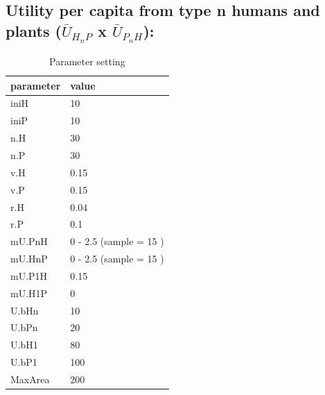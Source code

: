 \documentclass[]{book}
\begin{document}
\hypertarget{utility-per-capita-from-type-n-humans-and-plants-baru_h_np-x-baru_p_nh}{%
\subsection{\texorpdfstring{Utility per capita from type n humans and plants (\(\bar{U}_{H_{n}P}\) x \(\bar{U}_{P_{n}H}\)):}{Utility per capita from type n humans and plants (\textbackslash{}bar\{U\}\_\{H\_\{n\}P\} x \textbackslash{}bar\{U\}\_\{P\_\{n\}H\}):}}\label{utility-per-capita-from-type-n-humans-and-plants-baru_h_np-x-baru_p_nh}}

\begin{table}[!h]

\caption{\label{tab:3mUHnPmUPnHtablepdf}Parameter setting}
\centering
\begin{tabular}{l|l}
\hline
parameter & value\\
\hline
iniH & 10\\
\hline
iniP & 10\\
\hline
n.H & 30\\
\hline
n.P & 30\\
\hline
v.H & 0.15\\
\hline
v.P & 0.15\\
\hline
r.H & 0.04\\
\hline
r.P & 0.1\\
\hline
mU.PnH & 0 - 2.5 (sample = 15 )\\
\hline
mU.HnP & 0 - 2.5 (sample = 15 )\\
\hline
mU.P1H & 0.15\\
\hline
mU.H1P & 0\\
\hline
U.bHn & 10\\
\hline
U.bPn & 20\\
\hline
U.bH1 & 80\\
\hline
U.bP1 & 100\\
\hline
MaxArea & 200\\
\hline
\end{tabular}
\end{table}

\newpage
\end{document}
